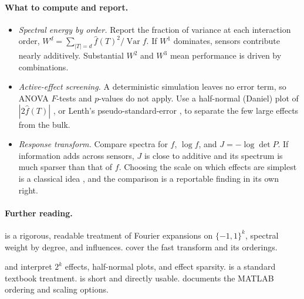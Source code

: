 \documentclass[11pt]{article}
\newcommand{\Var}{\operatorname{Var}}
\newcommand{\fh}{\widehat{f}}
\begin{document}
\paragraph{What to compute and report.}
\begin{itemize}[itemsep=2pt]
  \item \emph{Spectral energy by order.}
        Report the fraction of variance at each interaction order, $W^{d}=\sum_{|T|=d}\fh(T)^2/\Var f$.
        If $W^{1}$ dominates, sensors contribute nearly additively.
        Substantial $W^{2}$ and $W^{3}$ mean performance is driven by combinations.
  \item \emph{Active-effect screening.}
        A deterministic simulation leaves no error term, so ANOVA $F$-tests and $p$-values do not apply.
        Use a half-normal (Daniel) plot of $|2\fh(T)|$ \parencite{Daniel1959}, or Lenth's pseudo-standard-error \parencite{Lenth1989}, to separate the few large effects from the bulk.
  \item \emph{Response transform.}
        Compare spectra for $f$, $\log f$, and $J=-\log\det P$.
        If information adds across sensors, $J$ is close to additive and its spectrum is much sparser than that of $f$.
        Choosing the scale on which effects are simplest is a classical idea \parencite{BoxCox1964}, and the comparison is a reportable finding in its own right.
\end{itemize}

\paragraph{Further reading.}
\begin{reading}
  \item[Mathematics.] \textcite[Ch.~1--3]{ODonnell2014} is a rigorous, readable treatment of Fourier expansions on $\{-1,1\}^k$, spectral weight by degree, and influences.
        \textcite{FinoAlgazi1976} cover the fast transform and its orderings.
  \item[Applying it.] \textcite[Ch.~5--6]{BoxHunterHunter2005} and \textcite[Ch.~4]{WuHamada2009} interpret $2^k$ effects, half-normal plots, and effect sparsity.
        \textcite[Ch.~6]{Montgomery2017} is a standard textbook treatment.
        \textcite{Lenth1989} is short and directly usable.
        \textcite{MathWorksFWHT} documents the MATLAB ordering and scaling options.
\end{reading}

\end{document}
